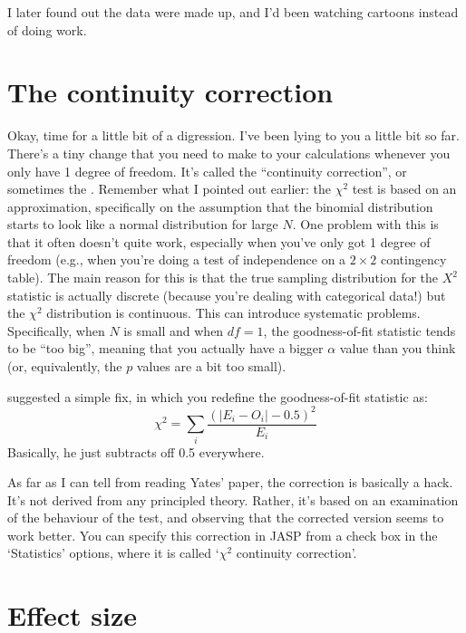 
I later found out the data were made up, and I'd been watching cartoons instead of doing work.
\vspace*{12pt}


\section{The continuity correction~\label{sec:yates}}

Okay, time for a little bit of a digression. I've been lying to you a little bit so far. There's a tiny change that you need to make to your calculations whenever you only have 1 degree of freedom. It's called the ``continuity correction'', or sometimes the . Remember what I pointed out earlier: the $\chi^2$ test is based on an approximation, specifically on the assumption that the binomial distribution starts to look like a normal distribution for large $N$. One problem with this is that it often doesn't quite work, especially when you've only got 1 degree of freedom (e.g., when you're doing a test of independence on a $2 \times 2$ contingency table). The main reason for this is that the true sampling distribution for the $X^2$ statistic is actually discrete (because you're dealing with categorical data!) but the $\chi^2$ distribution is continuous. This can introduce systematic problems. Specifically, when $N$ is small and when $df=1$, the goodness-of-fit statistic tends to be ``too big'', meaning that you actually have a bigger $\alpha$ value than you think (or, equivalently, the $p$ values are a bit too small). 

\vspace{0.5cm}
\begin{mdframed}[style=MyFrame,nobreak=true]
\textcite{Yates1934} suggested a simple fix, in which you redefine the goodness-of-fit statistic as:
$$
\chi^2 = \sum_{i} \frac{(|E_i - O_i| - 0.5)^2}{E_i}
$$
Basically, he just subtracts off 0.5 everywhere. 
\end{mdframed}

As far as I can tell from reading Yates' paper, the correction is basically a hack. It's not derived from any principled theory. Rather, it's based on an examination of the behaviour of the test, and observing that the corrected version seems to work better. You can specify this correction in JASP from a check box in the `Statistics' options, where it is called `$\chi^2$ continuity correction'. 


\section{Effect size~\label{sec:chisqeffectsize}}

